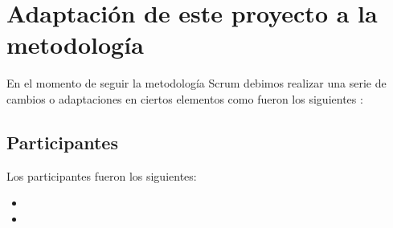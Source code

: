 \section{Adaptación de este proyecto a la metodología }
 En el momento de seguir la metodología Scrum debimos realizar una serie de cambios o adaptaciones en ciertos elementos como fueron los siguientes :
\subsection{Participantes}
Los participantes fueron los siguientes:
\begin{itemize}
\item
\item

\end{itemize}